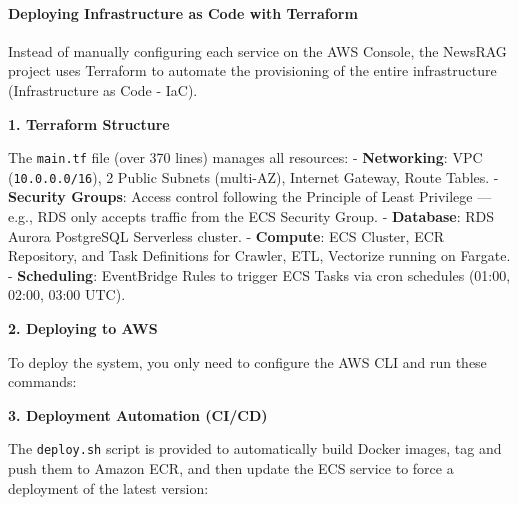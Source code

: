 \hypertarget{deploying-infrastructure-as-code-with-terraform}{%
\paragraph{Deploying Infrastructure as Code with
Terraform}}

Instead of manually configuring each service on the AWS Console, the
NewsRAG project uses Terraform to automate the provisioning of the
entire infrastructure (Infrastructure as Code - IaC).

\textbf{1. Terraform Structure}

The \texttt{main.tf} file (over 370 lines) manages all resources: -
\textbf{Networking}: VPC (\texttt{10.0.0.0/16}), 2 Public Subnets
(multi-AZ), Internet Gateway, Route Tables. - \textbf{Security Groups}:
Access control following the Principle of Least Privilege --- e.g., RDS
only accepts traffic from the ECS Security Group. - \textbf{Database}:
RDS Aurora PostgreSQL Serverless cluster. - \textbf{Compute}: ECS
Cluster, ECR Repository, and Task Definitions for Crawler, ETL,
Vectorize running on Fargate. - \textbf{Scheduling}: EventBridge Rules
to trigger ECS Tasks via cron schedules (01:00, 02:00, 03:00 UTC).

\textbf{2. Deploying to AWS}

To deploy the system, you only need to configure the AWS CLI and run
these commands:

\begin{Shaded}
\begin{Highlighting}[]


\end{Highlighting}
\end{Shaded}

\textbf{3. Deployment Automation (CI/CD)}

The \texttt{deploy.sh} script is provided to automatically build Docker
images, tag and push them to Amazon ECR, and then update the ECS service
to force a deployment of the latest version:

